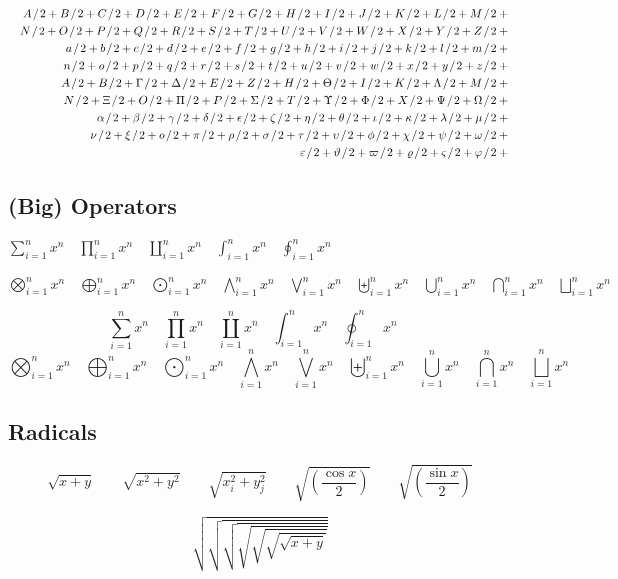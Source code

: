 	\def\test#1{#1 \divslash 2+{}}
	\begin{eqnarray*}
	  && {\testupperi}\\
	  && {\testupperii}\\
	  && {\testloweri}\\
	  && {\testlowerii}\\
	  && {\testupgreeki}\\
	  && {\testupgreekii}\\
	  && {\testlowgreeki}\\
	  && {\testlowgreekii}\\
	  && {\testlowgreekiii}
	\end{eqnarray*}

	\subsection{(Big) Operators \showfamily}

	\def\testop#1{#1_{i=1}^{n} x^{n} \quad}
	$
		\testop\sum
		\testop\prod
		\testop\coprod
		\testop\int
		\testop\oint
	$

	\noindent%
	$
		\testop\bigotimes
		\testop\bigoplus
		\testop\bigodot
		\testop\bigwedge
		\testop\bigvee
		\testop\biguplus
		\testop\bigcup
		\testop\bigcap
		\testop\bigsqcup
	$

	\begin{displaymath}
	  \testop\sum
	  \testop\prod
	  \testop\coprod
	  \testop\int
	  \testop\oint
	\end{displaymath}
	\begin{displaymath}
	  \testop\bigotimes
	  \testop\bigoplus
	  \testop\bigodot
	  \testop\bigwedge
	  \testop\bigvee
	  \testop\biguplus
	  \testop\bigcup
	  \testop\bigcap
	  \testop\bigsqcup
	\end{displaymath}

	\subsection{Radicals \showfamily}

	\begin{displaymath}
	  \sqrt{x+y} \qquad \sqrt{x^{2}+y^{2}} \qquad
	  \sqrt{x_{i}^{2}+y_{j}^{2}} \qquad
	  \sqrt{\left(\frac{\cos x}{2}\right)} \qquad
	  \sqrt{\left(\frac{\sin x}{2}\right)}
	\end{displaymath}

	\begingroup
	\delimitershortfall-1pt
	\begin{displaymath}
	  \sqrt{\sqrt{\sqrt{\sqrt{\sqrt{\sqrt{\sqrt{x+y}}}}}}}
	\end{displaymath}
	\endgroup %

